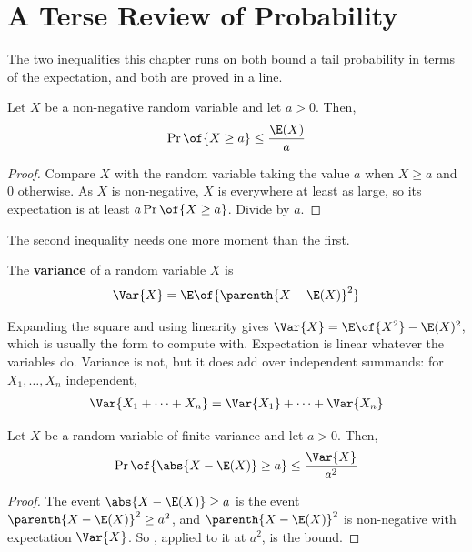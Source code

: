 \section{A Terse Review of Probability}

The two inequalities this chapter runs on both bound a tail probability in terms of the expectation, and both are proved in a line.

\begin{boxtheorem} \label{Ch3:Thm:Markov}
    Let $X$ be a non-negative random variable and let $a > 0$. Then,
    \begin{align*}
        \Pr\of{X \geq a} \leq \frac{\E(X)}{a}
    \end{align*}
\end{boxtheorem}
\begin{proof}
    Compare $X$ with the random variable taking the value $a$ when $X \geq a$ and $0$ otherwise. As $X$ is non-negative, $X$ is everywhere at least as large, so its expectation is at least $a \Pr\of{X \geq a}$. Divide by $a$.
\end{proof}

The second inequality needs one more moment than the first.

\begin{boxdefinition}[Variance]
    The \textbf{variance} of a random variable $X$ is
    \begin{align*}
        \Var{X} = \E\of{\parenth{X - \E(X)}^2}
    \end{align*}
\end{boxdefinition}

Expanding the square and using linearity gives $\Var{X} = \E\of{X^2} - \E(X)^2$, which is usually the form to compute with. Expectation is linear whatever the variables do. Variance is not, but it does add over independent summands: for $X_1, \ldots, X_n$ independent,
\begin{align*}
    \Var{X_1 + \cdots + X_n} = \Var{X_1} + \cdots + \Var{X_n}
\end{align*}

\begin{boxtheorem} \label{Ch3:Thm:Chebyshev}
    Let $X$ be a random variable of finite variance and let $a > 0$. Then,
    \begin{align*}
        \Pr\of{\abs{X - \E(X)} \geq a} \leq \frac{\Var{X}}{a^2}
    \end{align*}
\end{boxtheorem}
\begin{proof}
    The event $\abs{X - \E(X)} \geq a$ is the event $\parenth{X - \E(X)}^2 \geq a^2$, and $\parenth{X - \E(X)}^2$ is non-negative with expectation $\Var{X}$. So , applied to it at $a^2$, is the bound.
\end{proof}

